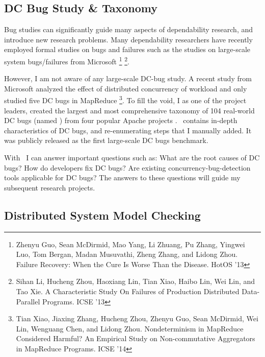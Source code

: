 \documentclass[11pt]{article}
\begin{document}
\subsection{DC Bug Study \& Taxonomy} 

Bug studies can significantly guide many aspects of dependability
research, and introduce new research problems. Many dependability researchers
have recently employed formal studies on bugs and failures such as the studies
on large-scale system bugs/failures from Microsoft \footnote{Zhenyu Guo, Sean
McDirmid, Mao Yang, Li Zhuang, Pu Zhang, Yingwei Luo, Tom Bergan, Madan
Musuvathi, Zheng Zhang, and Lidong Zhou.  Failure Recovery: When the Cure Is
Worse Than the Disease. HotOS '13} \footnote{Sihan Li, Hucheng Zhou, Haoxiang
Lin, Tian Xiao, Haibo Lin, Wei Lin, and Tao Xie. A Characteristic Study On
Failures of Production Distributed Data-Parallel Programs. ICSE '13}.

However, I am not aware of any large-scale DC-bug study. A recent study from
Microsoft analyzed the effect of distributed concurrency of workload and only
studied five DC bugs in MapReduce \footnote{Tian Xiao, Jiaxing Zhang, Hucheng
Zhou, Zhenyu Guo, Sean McDirmid, Wei Lin, Wenguang Chen, and Lidong Zhou.
Nondeterminism in MapReduce Considered Harmful?  An Empirical Study on
Non-commutative Aggregators in MapReduce Programs. ICSE '14}. To fill the void,
I as one of the project leaders, created the largest and most comprehensive
taxonomy of 104 real-world DC bugs (named \taxdc) from four popular Apache
projects \cite{Leesatapornwongsa+16-TaxDC}. \taxdc\ contains in-depth
characteristics of DC bugs, and re-enumerating steps that I manually added.  It
was publicly released as the first large-scale DC bugs benchmark.


With \taxdc\, I can answer important questions such as: 
What are the root causes of DC bugs?
How do developers fix DC bugs? 
Are existing concurrency-bug-detection tools applicable for DC bugs? 
The answers to these questions will guide my subsequent research projects.

\subsection{Distributed System Model Checking}
\end{document}

